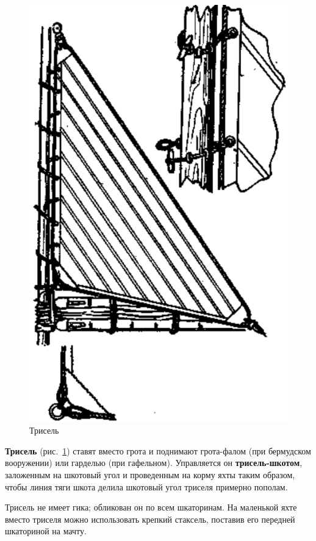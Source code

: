 \documentclass[a4paper, 12pt, twoside, final]{scrbook}
\begin{document}
\begin{figure}[htbp]
   \centering
   \includegraphics{49_Trisel} %
   \caption{Трисель}
   \label{fig:49}
\end{figure}

\textbf{Трисель} (рис.~\ref{fig:49}) ставят вместо грота и поднимают грота-фалом (при бермудском вооружении) или гарделью (при гафельном). Управляется он \textbf{трисель-шкотом}, заложенным на шкотовый угол и проведенным на корму яхты таким образом, чтобы линия тяги шкота делила шкотовый угол триселя примерно пополам.

Трисель не имеет гика; обликован он по всем шкаторинам. На маленькой яхте вместо триселя можно использовать крепкий стаксель, поставив его передней шкаториной на мачту.
\end{document}

